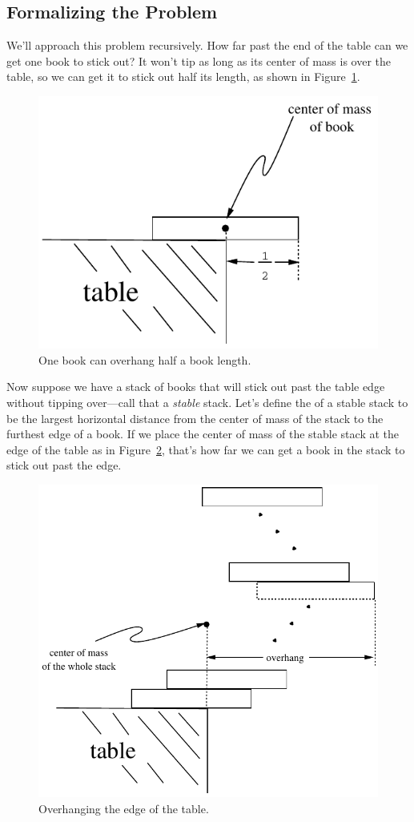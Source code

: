 \subsection{Formalizing the Problem}

We'll approach this problem recursively.  How far past the end of the
table can we get one book to stick out?  It won't tip as long as its
center of mass is over the table, so we can get it to stick out half its
length, as shown in Figure~\ref{one-stable-book}.

\begin{figure}[htbp]
\centerline{\includegraphics[width=.40\textwidth]{figures/bookstack-3}}
\caption{One book can overhang half a book length.}
\label{one-stable-book}
\end{figure}

Now suppose we have a stack of books that will stick out past the table
edge without tipping over---call that a \emph{stable} stack.  Let's define
the  of a stable stack to be the largest horizontal
distance from the center of mass of the stack to the furthest edge of a
book.  If we place the center of mass of the stable stack at the edge of
the table as in Figure~\ref{overhang}, that's how far we can get a book in
the stack to stick out past the edge.

\begin{figure}
\centerline{\includegraphics[width=.4\textwidth]{figures/bookstack-2}}
\caption{Overhanging the edge of the table.}
\label{overhang}
\end{figure}

